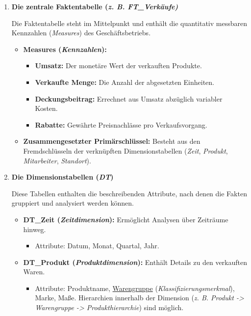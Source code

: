 \begin{enumerate}[label=\arabic*.), leftmargin=*]
    \item \textbf{Die zentrale Faktentabelle (\textit{\acs{z. B.} \acs{FT}\_Verkäufe)}} \par Die Faktentabelle steht im Mittelpunkt und enthält die quantitativ messbaren Kennzahlen (\textit{Measures}) des Geschäftsbetriebs. \cite{59}
    \begin{itemize}
        \item \textbf{Measures (\textit{Kennzahlen}):}
        \begin{itemize}
            \item \textbf{Umsatz:} Der monetäre Wert der verkauften Produkte. \cite{59}\cite{62}\cite{63}\cite{64}
            \item \textbf{Verkaufte Menge:} Die Anzahl der abgesetzten Einheiten. \cite{59}
            \item \textbf{Deckungsbeitrag:} Errechnet aus Umsatz abzüglich variabler Kosten. \cite{65}\cite{66}
            \item \textbf{Rabatte:} Gewährte Preisnachlässe pro Verkaufsvorgang.
        \end{itemize}
        \item \textbf{Zusammengesetzter Primärschlüssel:} Besteht aus den Fremdschlüsseln der verknüpften Dimensionstabellen (\textit{Zeit}, \textit{Produkt}, \textit{Mitarbeiter}, \textit{Standort}). \cite{62}\cite{63}\cite{64}
    \end{itemize}
    \item \textbf{Die Dimensionstabellen (\textit{\acs{DT}})} \par Diese Tabellen enthalten die beschreibenden Attribute, nach denen die Fakten gruppiert und analysiert werden können. \cite{67}
    \begin{itemize}
        \item \textbf{\acs{DT}\_Zeit (\textit{Zeitdimension}):} Ermöglicht Analysen über Zeiträume hinweg. \cite{67}
        \begin{itemize}
            \item Attribute: Datum, Monat, Quartal, Jahr. \cite{62}\cite{63}\cite{64}
        \end{itemize}
        \item \textbf{\acs{DT}\_Produkt (\textit{Produktdimension}):} Enthält Details zu den verkauften Waren. \cite{67}
        \begin{itemize}
            \item Attribute: Produktname, \uline{Warengruppe} (\textit{Klassifizierungsmerkmal}), Marke, Maße. \cite{68} \cite{62}\cite{63}\cite{64} Hierarchien innerhalb der Dimension (\textit{\acs{z. B.} Produkt -> Warengruppe -> Produkthierarchie}) sind möglich. \cite{67}\cite{69}

\end{itemize}
\end{itemize}
\end{enumerate}
